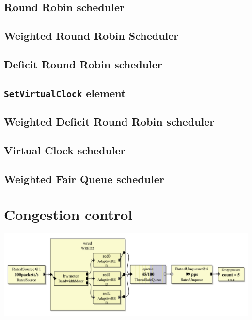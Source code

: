\documentclass[a4paper]{article}
\begin{document}
  \subsection{Round Robin scheduler}
  \subsection{Weighted Round Robin Scheduler}
  \subsection{Deficit Round Robin scheduler}
  \subsection{\texttt{SetVirtualClock} element}
  \subsection{Weighted Deficit Round Robin scheduler}
  \subsection{Virtual Clock scheduler}
  \subsection{Weighted Fair Queue scheduler}
  \section{Congestion control}
    \begin{center}
	  \includegraphics[scale=0.5]{wred2.pdf}
	  \label{fig:wred2}
    \end{center}
  
\end{document}
